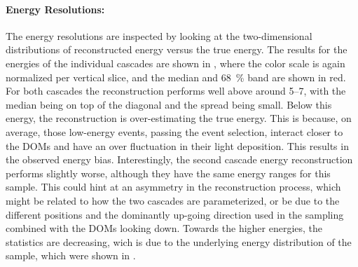 \paragraph{Energy Resolutions:}

The energy resolutions are inspected by looking at the two-dimensional distributions of reconstructed energy versus the true energy. The results for the energies of the individual cascades are shown in , where the color scale is again normalized per vertical slice, and the median and \SI{68}{\percent} band are shown in red. For both cascades the reconstruction performs well above around \SIrange{5}{7}{\gev}, with the median being on top of the diagonal and the spread being small. Below this energy, the reconstruction is over-estimating the true energy. This is because, on average, those low-energy events, passing the event selection, interact closer to the DOMs and have an over fluctuation in their light deposition. This results in the observed energy bias. Interestingly, the second cascade energy reconstruction performs slightly worse, although they have the same energy ranges for this sample. This could hint at an asymmetry in the reconstruction process, which might be related to how the two cascades are parameterized, or be due to the different positions and the dominantly up-going direction used in the sampling combined with the DOMs looking down. Towards the higher energies, the statistics are decreasing, wich is due to the underlying energy distribution of the sample, which were shown in .


